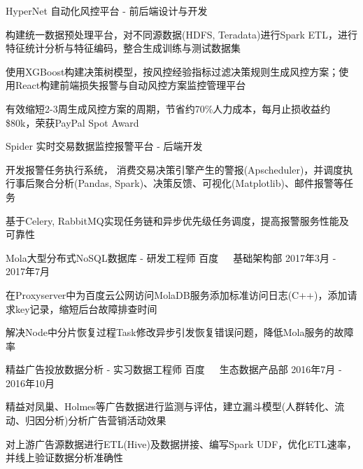 \documentclass[11pt, a4paper, UTF8]{awesome-cv}
\begin{document}
\begin{cventries}
  \cventry
    {HyperNet 自动化风控平台 - 前后端设计与开发} %
    {} %
    {} %
    {\ } %
    {
      \begin{cvitems} %
        \item {构建统一数据预处理平台，对不同源数据(HDFS, Teradata)进行Spark ETL，进行特征统计分析与特征编码，整合生成训练与测试数据集}
        \item {使用XGBoost构建决策树模型，按风控经验指标过滤决策规则生成风控方案；使用React构建前端损失报警与自动风控方案监控管理平台}
        \item {有效缩短2-3周生成风控方案的周期，节省约70\%人力成本，每月止损收益约\$80k，荣获PayPal Spot Award}
      \end{cvitems}
    }

  \cventry
    {Spider 实时交易数据监控报警平台 - 后端开发} %
    {} %
    {} %
    {\ } %
    {
      \begin{cvitems} %
        \item {开发报警任务执行系统， 消费交易决策引擎产生的警报(Apscheduler)，并调度执行事后聚合分析(Pandas, Spark)、决策反馈、可视化(Matplotlib)、邮件报警等任务}
        \item {基于Celery, RabbitMQ实现任务链和异步优先级任务调度，提高报警服务性能及可靠性}
      \end{cvitems}
    }
    
  \cventry
    {Mola大型分布式NoSQL数据库 - 研发工程师} %
    {百度{\ \cdotp\ \ }基础架构部} %
    {2017年3月 - 2017年7月} %
    {\ } %
    {
      \begin{cvitems} %
        \item {在Proxyserver中为百度云公网访问MolaDB服务添加标准访问日志(C++)，添加请求key记录，缩短后台故障排查时间}
        \item {解决Node中分片恢复过程Task修改异步引发恢复错误问题，降低Mola服务的故障率}
      \end{cvitems}
    }

  \cventry
    {精益广告投放数据分析 - 实习数据工程师} %
    {百度{\ \cdotp\ \ }生态数据产品部} %
    {2016年7月 - 2016年10月} %
    {\ } %
    {
      \begin{cvitems} %
        \item {精益对凤巢、Holmes等广告数据进行监测与评估，建立漏斗模型(人群转化、流动、归因分析)分析广告营销活动效果}
        \item {对上游广告源数据进行ETL(Hive)及数据拼接、编写Spark UDF，优化ETL速率，并线上验证数据分析准确性}
      \end{cvitems}
    }
        

\end{cventries}
\end{document}
